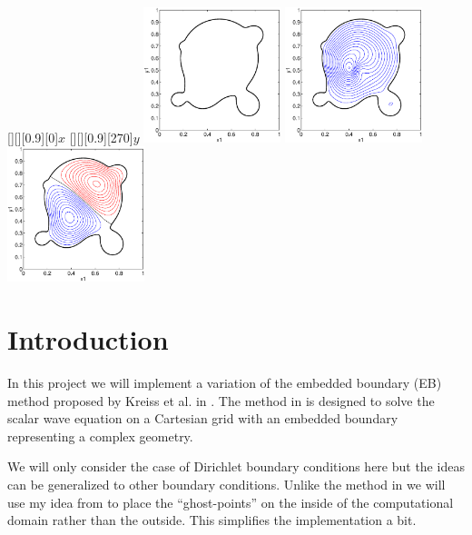 \documentclass[11pt]{article}
\begin{document}
\vspace{1cm}
 \begin{center}
 [][][0.9][0]{$x$}
 [][][0.9][270]{$y$}
\includegraphics[width=0.3\textwidth]{Membrane}
\hspace{0.2cm}
\includegraphics[width=0.3\textwidth]{Mode1}
\hspace{0.2cm}
\includegraphics[width=0.3\textwidth]{Mode2}
\end{center}


\clearpage

\section{Introduction}
In this project we will implement a variation of the embedded boundary (EB) method proposed by Kreiss et al. in \cite{kreiss:1940}. The method in \cite{kreiss:1940} is designed to solve the scalar wave equation on a Cartesian grid with an embedded boundary representing  a complex geometry.  

We will only consider the case of Dirichlet boundary conditions here but the ideas can be generalized to other boundary conditions. Unlike the method in \cite{kreiss:1940} we will use my idea from \cite{AppPetEB09} to place the ``ghost-points'' on the inside of the computational domain rather than the outside. This simplifies the implementation a bit. 
\end{document}
